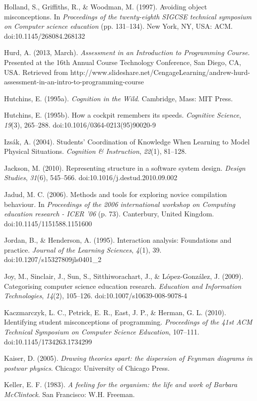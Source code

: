 Holland, S., Griffiths, R., \& Woodman, M. (1997). Avoiding object
misconceptions. In \emph{Proceedings of the twenty-eighth SIGCSE
technical symposium on Computer science education} (pp. 131--134). New
York, NY, USA: ACM. doi:10.1145/268084.268132

Hurd, A. (2013, March). \emph{Assessment in an Introduction to
Programming Course}. Presented at the 16th Annual Course Technology
Conference, San Diego, CA, USA. Retrieved from
http://www.slideshare.net/CengageLearning/andrew-hurd-assessment-in-an-intro-to-programming-course

Hutchins, E. (1995a). \emph{Cognition in the Wild}. Cambridge, Mass: MIT
Press.

Hutchins, E. (1995b). How a cockpit remembers its speeds.
\emph{Cognitive Science}, \emph{19}(3), 265--288.
doi:10.1016/0364-0213(95)90020-9

Izsák, A. (2004). Students' Coordination of Knowledge When Learning to
Model Physical Situations. \emph{Cognition \& Instruction},
\emph{22}(1), 81--128.

Jackson, M. (2010). Representing structure in a software system design.
\emph{Design Studies}, \emph{31}(6), 545--566.
doi:10.1016/j.destud.2010.09.002

Jadud, M. C. (2006). Methods and tools for exploring novice compilation
behaviour. In \emph{Proceedings of the 2006 international workshop on
Computing education research - ICER '06} (p. 73). Canterbury, United
Kingdom. doi:10.1145/1151588.1151600

Jordan, B., \& Henderson, A. (1995). Interaction analysis: Foundations
and practice. \emph{Journal of the Learning Sciences}, \emph{4}(1), 39.
doi:10.1207/s15327809jls0401\_2

Joy, M., Sinclair, J., Sun, S., Sitthiworachart, J., \& López-González,
J. (2009). Categorising computer science education research.
\emph{Education and Information Technologies}, \emph{14}(2), 105--126.
doi:10.1007/s10639-008-9078-4

Kaczmarczyk, L. C., Petrick, E. R., East, J. P., \& Herman, G. L.
(2010). Identifying student misconceptions of programming.
\emph{Proceedings of the 41st ACM Technical Symposium on Computer
Science Education}, 107--111. doi:10.1145/1734263.1734299

Kaiser, D. (2005). \emph{Drawing theories apart: the dispersion of
Feynman diagrams in postwar physics}. Chicago: University of Chicago
Press.

Keller, E. F. (1983). \emph{A feeling for the organism: the life and
work of Barbara McClintock}. San Francisco: W.H. Freeman.

